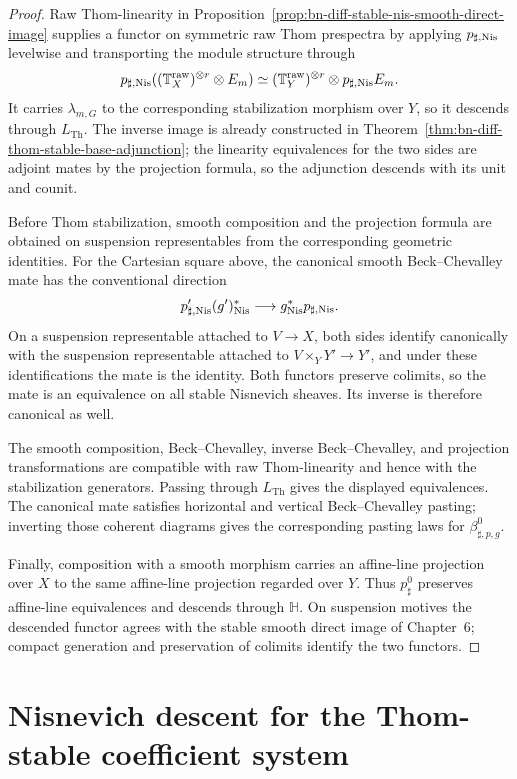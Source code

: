 \begin{proof}
Raw Thom-linearity in
Proposition~\ref{prop:bn-diff-stable-nis-smooth-direct-image} supplies a functor
on symmetric raw Thom prespectra by applying \(p_{\sharp,\mathrm{Nis}}\) levelwise and
transporting the module structure through
\[
  p_{\sharp,\mathrm{Nis}}
  ((\mathbb T_X^{\mathrm{raw}})^{\otimes r}\otimes E_m)
  \simeq
  (\mathbb T_Y^{\mathrm{raw}})^{\otimes r}
  \otimes p_{\sharp,\mathrm{Nis}}E_m.
\]
It carries \(\lambda_{m,G}\) to the corresponding stabilization morphism over
\(Y\), so it descends through \(L_{\mathrm{Th}}\).  The inverse image is already
constructed in Theorem~\ref{thm:bn-diff-thom-stable-base-adjunction}; the
linearity equivalences for the two sides are adjoint mates by the projection
formula, so the adjunction descends with its unit and counit.

Before Thom stabilization, smooth composition and the projection formula are
obtained on suspension representables from the corresponding geometric
identities.  For the Cartesian square above, the canonical smooth
Beck--Chevalley mate has the conventional direction
\[
    p'_{\sharp,\mathrm{Nis}}(g')^*_{\mathrm{Nis}}
    \longrightarrow
    g^*_{\mathrm{Nis}}p_{\sharp,\mathrm{Nis}}.
\]
On a suspension representable attached to $V\to X$, both sides identify
canonically with the suspension representable attached to
$V\times_YY'\to Y'$, and under these identifications the mate is the identity.
Both functors preserve colimits, so the mate is an equivalence on all stable
Nisnevich sheaves.  Its inverse is therefore canonical as well.

The smooth composition, Beck--Chevalley, inverse Beck--Chevalley, and
projection transformations are compatible with raw Thom-linearity and hence
with the stabilization generators.  Passing through \(L_{\mathrm{Th}}\)
gives the displayed equivalences.  The canonical mate satisfies horizontal
and vertical Beck--Chevalley pasting; inverting those coherent diagrams gives
the corresponding pasting laws for $\beta_{\sharp,p,g}^{0}$.

Finally, composition with a smooth morphism carries an affine-line projection
over \(X\) to the same affine-line projection regarded over \(Y\).  Thus
\(p_\sharp^0\) preserves affine-line equivalences and descends through
\(\mathbb H\).  On suspension motives the descended functor agrees with the
stable smooth direct image of Chapter~6; compact generation and preservation of
colimits identify the two functors.
\end{proof}

\section{Nisnevich descent for the Thom-stable coefficient system}
\label{sec:bn-diff-thom-stable-descent}

